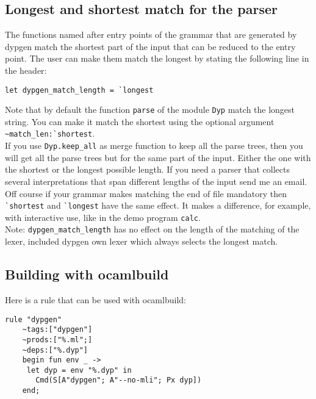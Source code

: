 \documentclass[12pt]{article}
\begin{document}
{\subsection{Longest and shortest match for the parser}\label{match_length}

The functions named after entry points of the grammar that are generated by dypgen match the shortest part of the input that can be reduced to the entry point. The user can make them match the longest by stating the following line in the header:
\begin{verbatim}
let dypgen_match_length = `longest
\end{verbatim}
Note that by default the function \verb|parse| of the module \verb|Dyp| match the longest string. You can make it match the shortest using the optional argument \verb|~match_len:`shortest|.\\

If you use \verb|Dyp.keep_all| as merge function to keep all the parse trees, then you will get all the parse trees but for the same part of the input. Either the one with the shortest or the longest possible length. If you need a parser that collects several interpretations that span different lengths of the input send me an email.\\

Off course if your grammar makes matching the end of file mandatory then \verb|`shortest| and \verb|`longest| have the same effect. It makes a difference, for example, with interactive use, like in the demo program \verb|calc|.\\

Note: \verb|dypgen_match_length| has no effect on the length of the matching of the lexer, included dypgen own lexer which always selects the longest match.

\subsection{Building with ocamlbuild}

Here is a rule that can be used with ocamlbuild:
\begin{verbatim}
rule "dypgen"
    ~tags:["dypgen"]
    ~prods:["%.ml";]
    ~deps:["%.dyp"]
    begin fun env _ ->
     let dyp = env "%.dyp" in
       Cmd(S[A"dypgen"; A"--no-mli"; Px dyp])
    end;
\end{verbatim}


}
\end{document}
